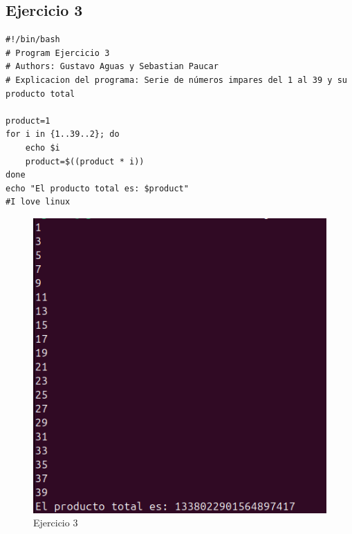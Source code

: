 \documentclass[11pt,twoside]{book}
\begin{document}
\subsection{Ejercicio 3}
\begin{lstlisting}
#!/bin/bash
# Program Ejercicio 3
# Authors: Gustavo Aguas y Sebastian Paucar
# Explicacion del programa: Serie de números impares del 1 al 39 y su producto total

product=1
for i in {1..39..2}; do
    echo $i
    product=$((product * i))
done
echo "El producto total es: $product"
#I love linux
\end{lstlisting}
\begin{figure}
    \centering
    \includegraphics[width=0.75\linewidth]{series/ej3.png}
    \caption{Ejercicio 3}
\end{figure}
\newpage
\end{document}

